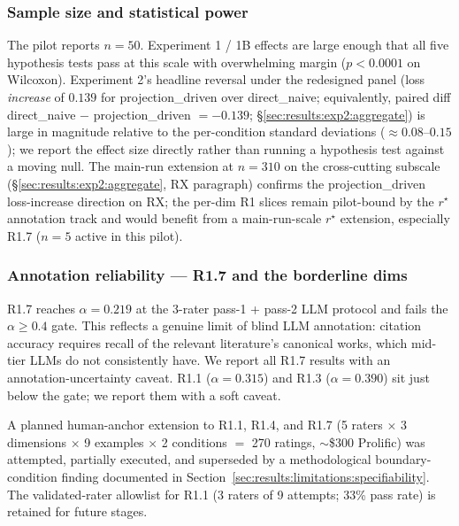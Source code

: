 \subsubsection{Sample size and statistical power}
The pilot reports $n = 50$. Experiment 1 / 1B effects are large enough that all five hypothesis tests pass at this scale with overwhelming margin ($p < 0.0001$ on Wilcoxon). Experiment 2's headline reversal under the redesigned panel (loss \emph{increase} of $0.139$ for projection\_driven over direct\_naive; equivalently, paired diff direct\_naive $-$ projection\_driven $= -0.139$; \S\ref{sec:results:exp2:aggregate}) is large in magnitude relative to the per-condition standard deviations ($\approx 0.08$--$0.15$); we report the effect size directly rather than running a hypothesis test against a moving null. The main-run extension at $n = 310$ on the cross-cutting subscale (\S\ref{sec:results:exp2:aggregate}, RX paragraph) confirms the projection\_driven loss-increase direction on RX; the per-dim R1 slices remain pilot-bound by the $r^\star$ annotation track and would benefit from a main-run-scale $r^\star$ extension, especially R1.7 ($n = 5$ active in this pilot).

\subsubsection{Annotation reliability --- R1.7 and the borderline dims}
R1.7 reaches $\alpha = 0.219$ at the 3-rater pass-1 + pass-2 LLM protocol and fails the $\alpha \geq 0.4$ gate. This reflects a genuine limit of blind LLM annotation: citation accuracy requires recall of the relevant literature's canonical works, which mid-tier LLMs do not consistently have. We report all R1.7 results with an annotation-uncertainty caveat. R1.1 ($\alpha = 0.315$) and R1.3 ($\alpha = 0.390$) sit just below the gate; we report them with a soft caveat.

A planned human-anchor extension to R1.1, R1.4, and R1.7 (5 raters $\times$ 3 dimensions $\times$ 9 examples $\times$ 2 conditions $=$ 270 ratings, $\sim$\$300 Prolific) was attempted, partially executed, and superseded by a methodological boundary-condition finding documented in Section~\ref{sec:results:limitations:specifiability}. The validated-rater allowlist for R1.1 (3 raters of 9 attempts; 33\% pass rate) is retained for future stages.


